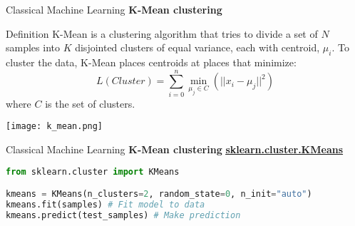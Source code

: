\documentclass{beamer}
\begin{document}
\begin{frame}[fragile]{Classical Machine Learning}
    \textbf{K-Mean clustering}
    \begin{block}{Definition}
        K-Mean is a clustering algorithm that tries to divide a set of $N$ samples into $K$ disjointed clusters of equal variance, each with centroid, $\mu_{i}$. To cluster the data, K-Mean places centroids at places that minimize:
        \vspace{-0.5cm}
        \begin{equation*}
            L(Cluster) = \sum_{i=0}^{n}\min\limits_{\mu_{j}\in C}(||x_{i} - \mu_{j}||^2)
        \end{equation*}
        where $C$ is the set of clusters.
        \begin{center}
            \texttt{[image: k\_mean.png]}
        \end{center}
    \end{block}
\end{frame}
\begin{frame}[fragile]{Classical Machine Learning}
    \textbf{K-Mean clustering}
    \href{https://scikit-learn.org/stable/modules/generated/sklearn.cluster.KMeans.html}{\textbf{\underline{sklearn.cluster.KMeans}}}
    \begin{example}
        \begin{lstlisting}[language=Python]
from sklearn.cluster import KMeans

kmeans = KMeans(n_clusters=2, random_state=0, n_init="auto")
kmeans.fit(samples) # Fit model to data
kmeans.predict(test_samples) # Make prediction
        \end{lstlisting}
    \end{example}
\end{frame}
\end{document}
